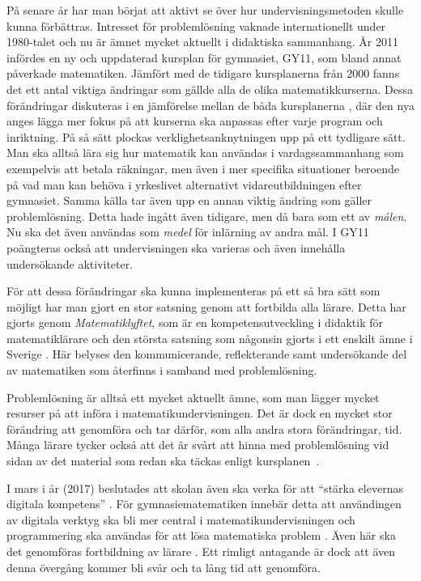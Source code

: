 \textcolor{lila}{På senare år har man börjat att aktivt se över hur undervisningsmetoden skulle kunna förbättras. Intresset för problemlösning vaknade internationellt under 1980-talet \cite{80-talet} och nu är ämnet mycket aktuellt i didaktiska sammanhang. År 2011 infördes en ny och uppdaterad kursplan för gymnasiet, GY11, som bland annat påverkade matematiken. Jämfört med de tidigare kursplanerna från 2000 fanns det ett antal viktiga ändringar som gällde alla de olika matematikkurserna. 
Dessa förändringar diskuteras i en jämförelse mellan de båda kursplanerna \cite{GY00-GY11}, där den nya anges lägga mer fokus på att kurserna ska anpassas efter varje program och inriktning. På så sätt plockas verklighetsanknytningen upp på ett tydligare sätt. Man ska alltså lära sig hur matematik kan användas i vardagssammanhang som exempelvis att betala räkningar, men även i mer specifika situationer beroende på vad man kan behöva i yrkeslivet alternativt vidareutbildningen efter gymnasiet. 
Samma källa tar även upp en annan viktig ändring som gäller problemlösning. Detta hade ingått även tidigare, men då bara som ett av \textsl{målen}. Nu ska det även användas som \textsl{medel} för inlärning av andra mål. I GY11 poängteras också att undervisningen ska varieras och även innehålla undersökande aktiviteter.}

\textcolor{lila}{För att dessa förändringar ska kunna implementeras på ett så bra sätt som möjligt har man gjort en stor satsning genom att fortbilda alla lärare. Detta har gjorts genom \textsl{Matematiklyftet}, som är en kompetensutveckling i didaktik för matematiklärare \cite{Namnaren} och den största satsning som någonsin gjorts i ett enskilt ämne i Sverige \cite{mattelyftet}. Här belyses den kommunicerande, reflekterande samt undersökande del av matematiken som återfinns i samband med problemlösning.}
            
\textcolor{lila}{Problemlösning är alltså ett mycket aktuellt ämne, som man lägger mycket resurser på att införa i matematikundervisningen. Det är dock en mycket stor förändring att genomföra och tar därför, som alla andra stora förändringar, tid. Många lärare tycker också att det är svårt att hinna med problemlösning vid sidan av det material som redan ska täckas enligt kursplanen~\cite{2016Senare}.}


\textcolor{lila}{I mars i år (2017) beslutades att skolan även ska verka för att ``stärka elevernas digitala kompetens'' \cite{regeringen}. För gymnasiematematiken innebär detta att användingen av digitala verktyg ska bli mer central i matematikundervisningen och programmering ska användas för att lösa matematiska problem \cite{itiskolan}. Även här ska det genomföras fortbildning av lärare \cite{prog_utbildning}. Ett rimligt antagande är dock att även denna övergång kommer bli svår och ta lång tid att genomföra.}